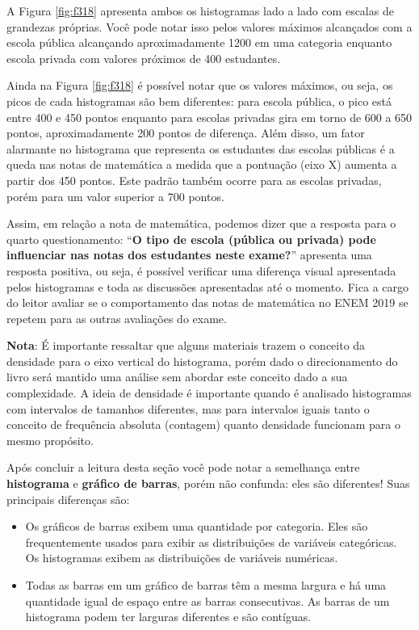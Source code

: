 \documentclass[
  oneside]{book}
\begin{document}
A Figura \ref{fig:f318} apresenta ambos os histogramas lado a lado com escalas de grandezas próprias. Você pode notar isso pelos valores máximos alcançados com a escola pública alcançando aproximadamente 1200 em uma categoria enquanto escola privada com valores próximos de 400 estudantes.

Ainda na Figura \ref{fig:f318} é possível notar que os valores máximos, ou seja, os picos de cada histogramas são bem diferentes: para escola pública, o pico está entre 400 e 450 pontos enquanto para escolas privadas gira em torno de 600 a 650 pontos, aproximadamente 200 pontos de diferença. Além disso, um fator alarmante no histograma que representa os estudantes das escolas públicas é a queda nas notas de matemática a medida que a pontuação (eixo X) aumenta a partir dos 450 pontos. Este padrão também ocorre para as escolas privadas, porém para um valor superior a 700 pontos.

Assim, em relação a nota de matemática, podemos dizer que a resposta para o quarto questionamento: ``\textbf{O tipo de escola (pública ou privada) pode influenciar nas notas dos estudantes neste exame?}'' apresenta uma resposta positiva, ou seja, é possível verificar uma diferença visual apresentada pelos histogramas e toda as discussões apresentadas até o momento. Fica a cargo do leitor avaliar se o comportamento das notas de matemática no ENEM 2019 se repetem para as outras avaliações do exame.

\textbf{Nota}: É importante ressaltar que alguns materiais trazem o conceito da densidade para o eixo vertical do histograma, porém dado o direcionamento do livro será mantido uma análise sem abordar este conceito dado a sua complexidade. A ideia de densidade é importante quando é analisado histogramas com intervalos de tamanhos diferentes, mas para intervalos iguais tanto o conceito de frequência absoluta (contagem) quanto densidade funcionam para o mesmo propósito.

Após concluir a leitura desta seção você pode notar a semelhança entre \textbf{histograma} e \textbf{gráfico de barras}, porém não confunda: eles são diferentes! Suas principais diferenças são:

\begin{itemize}
\item
  Os gráficos de barras exibem uma quantidade por categoria. Eles são frequentemente usados para exibir as distribuições de variáveis categóricas. Os histogramas exibem as distribuições de variáveis numéricas.
\item
  Todas as barras em um gráfico de barras têm a mesma largura e há uma quantidade igual de espaço entre as barras consecutivas. As barras de um histograma podem ter larguras diferentes e são contíguas.
\end{itemize}
\end{document}
